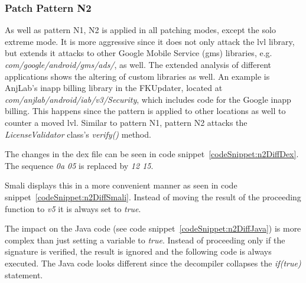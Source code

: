 \subsubsection{Patch Pattern N2}
As well as pattern N1, N2 is applied in all patching modes, except the solo extreme mode.
It is more aggressive since it does not only attack the \gls{lvl} library, but extends it attacks to other Google Mobile Service (gms) libraries, e.g.  \textit{com/google/android/gms/ads/}, as well.
The extended analysis of different applications shows the altering of custom libraries as well.
An example is AnjLab's inapp billing library \cite{inappBilling} in the FKUpdater, located at \textit{com/anjlab/android/iab/v3/Security}, which includes code for the Google inapp billing.
This happens since the pattern is applied to other locations as well to counter a moved \gls{lvl}.
Similar to pattern N1, pattern N2 attacks the \textit{LicenseValidator} class's \textit{verify()} method.
\newline

The changes in the \gls{dex} file can be seen in code snippet~\ref{codeSnippet:n2DiffDex}.
The sequence \textit{0a 05} is replaced by \textit{12 15}.
\newline

Smali displays this in a more convenient manner as seen in code snippet~\ref{codeSnippet:n2DiffSmali}.
Instead of moving the result of the proceeding function to \textit{v5} it is always set to \textit{true}.
\newline


The impact on the Java code (see code snippet~\ref{codeSnippet:n2DiffJava}) is more complex than just setting a variable to \textit{true}.
Instead of proceeding only if the signature is verified, the result is ignored and the following code is always executed.
The Java code looks different since the decompiler collapses the \textit{if(true)} statement.
\newline


